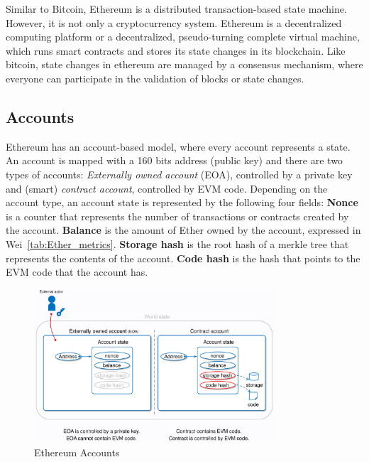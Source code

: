 \documentclass[11pt,a4paper]{report}
\begin{document}
Similar to Bitcoin, Ethereum\cite{article:eth}\cite{book:masteringETH} is a distributed transaction-based state machine. However, it is not only a cryptocurrency system. Ethereum is a decentralized computing platform or a decentralized, pseudo-turning complete virtual machine, which runs smart contracts and stores its state changes in its blockchain. Like bitcoin, state changes in ethereum are managed by a consensus mechanism, where everyone can participate in the validation of  blocks or state changes.

\subsection{Accounts}\label{sec:accounts}
Ethereum\cite{article:eth}\cite{wood2014ethereum} has an account-based model, where every account represents a state. An account is mapped with a 160 bits address (public key) and there are two types of accounts: \textit{Externally owned account} (EOA), controlled by a private key and (smart) \textit{contract account}, controlled by EVM code. Depending on the account type, an account state is represented by the following four fields: \textbf{Nonce} is a counter that represents the number of transactions or contracts created by the account. \textbf{Balance} is the amount of Ether owned by the account, expressed in Wei~\ref{tab:Ether_metrics}. \textbf{Storage hash} is the root hash of a merkle tree that represents the contents of the account. \textbf{Code hash} is the hash that points to the EVM code that the account has.
\begin{figure}[htp]
	\centering
	\includegraphics[width=0.8\textwidth]{./images/accounts}
	\caption{Ethereum Accounts\cite{evm-illustrate}}
	\label{fig:accounts}
\end{figure}
\end{document}
